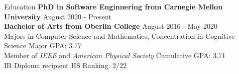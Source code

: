 \documentclass{resume}
\begin{document}
\begin{rSection}{Education}
{\bf PhD in Software Enginnering from Carnegie Mellon University} \hfill { August 2020 - Present} \\ 
{\bf Bachelor of Arts from Oberlin College} \hfill { August 2016 - May 2020} \\ 
Majors in Computer Science and Mathematics, Concentration in Cognitive Science \hfill {Major GPA: 3.77} \\
Member of {\em IEEE} and {\em American Physical Society} \hfill {Cumulative GPA: 3.71} \\
IB Diploma recipient \hfill {HS Ranking: 2/22}
\end{rSection}

\end{document}
